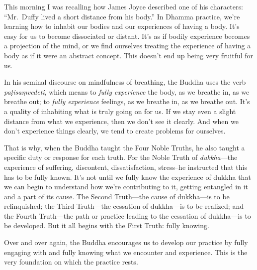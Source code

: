 
This morning I was recalling how James Joyce described one of his 
characters: ``Mr. Duffy lived a short distance from his body.'' In 
Dhamma practice, we're learning how to inhabit our bodies and our 
experiences of having a body. It's easy for us to become dissociated or 
distant. It's as if bodily experience becomes a projection of the mind, 
or we find ourselves treating the experience of having a body as if it 
were an abstract concept. This doesn't end up being very fruitful for 
us.

In his seminal discourse on mindfulness of breathing, the Buddha uses 
the verb \emph{paṭisaṃvedeti}, which means to \emph{fully 
experience} the body, as we breathe in, as we breathe out; to 
\emph{fully experience} feelings, as we breathe in, as we breathe out. 
It's a quality of inhabiting what is truly going on for us. If we stay 
even a slight distance from what we experience, then we don't see it 
clearly. And when we don't experience things clearly, we tend to create 
problems for ourselves.

That is why, when the Buddha taught the Four Noble Truths, he also 
taught a specific duty or response for each truth. For the Noble Truth 
of \emph{dukkha}---the experience of suffering, discontent, 
dissatisfaction, stress–he instructed that this has to be fully 
known. It's not until we fully know the experience of dukkha that we 
can begin to understand how we're contributing to it, getting entangled 
in it and a part of its cause. The Second Truth---the cause of 
dukkha---is to be relinquished; the Third Truth---the cessation of 
dukkha---is to be realized; and the Fourth Truth---the path or practice 
leading to the cessation of dukkha---is to be developed. But it all 
begins with the First Truth: fully knowing.

Over and over again, the Buddha encourages us to develop our practice 
by fully engaging with and fully knowing what we encounter and 
experience. This is the very foundation on which the practice rests.


